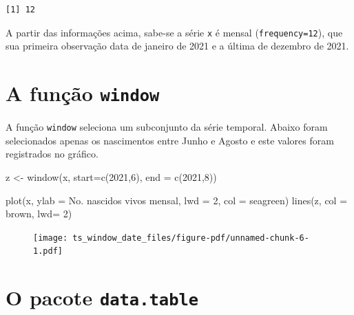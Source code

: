 \documentclass[
  letterpaper,
  DIV=11,
  numbers=noendperiod]{scrartcl}
\newenvironment{Shaded}{\begin{snugshade}}{\end{snugshade}}
\newcommand{\AttributeTok}[1]{\textcolor[rgb]{0.40,0.45,0.13}{#1}}
\newcommand{\DecValTok}[1]{\textcolor[rgb]{0.68,0.00,0.00}{#1}}
\newcommand{\FunctionTok}[1]{\textcolor[rgb]{0.28,0.35,0.67}{#1}}
\newcommand{\NormalTok}[1]{\textcolor[rgb]{0.00,0.23,0.31}{#1}}
\newcommand{\OtherTok}[1]{\textcolor[rgb]{0.00,0.23,0.31}{#1}}
\newcommand{\StringTok}[1]{\textcolor[rgb]{0.13,0.47,0.30}{#1}}
\theoremstyle{plain}
\theoremstyle{plain}
\theoremstyle{definition}
\theoremstyle{definition}
\theoremstyle{remark}
\begin{document}
\begin{verbatim}
[1] 12
\end{verbatim}

A partir das informações acima, sabe-se a série \texttt{x} é mensal
(\texttt{frequency=12}), que sua primeira observação data de janeiro de
2021 e a última de dezembro de 2021.

\hypertarget{a-funuxe7uxe3o-window}{%
\section{\texorpdfstring{A função
\texttt{window}}{A função window}}\label{a-funuxe7uxe3o-window}}

A função \texttt{window} seleciona um subconjunto da série temporal.
Abaixo foram selecionados apenas os nascimentos entre Junho e Agosto e
este valores foram registrados no gráfico.

\begin{Shaded}
\begin{Highlighting}[]
\NormalTok{z }\OtherTok{\textless{}{-}} \FunctionTok{window}\NormalTok{(x, }\AttributeTok{start=}\FunctionTok{c}\NormalTok{(}\DecValTok{2021}\NormalTok{,}\DecValTok{6}\NormalTok{), }\AttributeTok{end =} \FunctionTok{c}\NormalTok{(}\DecValTok{2021}\NormalTok{,}\DecValTok{8}\NormalTok{))}

\FunctionTok{plot}\NormalTok{(x, }\AttributeTok{ylab =} \StringTok{\textquotesingle{}No. nascidos vivos mensal\textquotesingle{}}\NormalTok{, }\AttributeTok{lwd =} \DecValTok{2}\NormalTok{, }\AttributeTok{col =} \StringTok{\textquotesingle{}seagreen\textquotesingle{}}\NormalTok{)}
\FunctionTok{lines}\NormalTok{(z, }\AttributeTok{col =} \StringTok{\textquotesingle{}brown\textquotesingle{}}\NormalTok{, }\AttributeTok{lwd=} \DecValTok{2}\NormalTok{)}
\end{Highlighting}
\end{Shaded}

\begin{figure}[H]

{\centering \texttt{[image: ts\_window\_date\_files/figure-pdf/unnamed-chunk-6-1.pdf]}

}

\end{figure}

\hypertarget{o-pacote-data.table}{%
\section{\texorpdfstring{O pacote
\texttt{data.table}}{O pacote data.table}}\label{o-pacote-data.table}}
\end{document}
